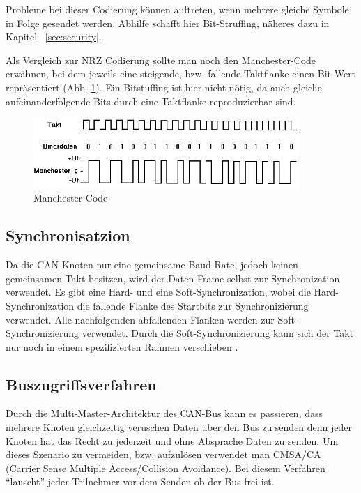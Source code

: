 Probleme bei dieser Codierung können auftreten, wenn mehrere gleiche Symbole in Folge
gesendet werden. Abhilfe schafft hier Bit-Struffing, näheres dazu in Kapitel ~\ref{sec:security}.

Als Vergleich zur NRZ Codierung sollte man noch den Manchester-Code erwähnen, bei dem
jeweils eine steigende, bzw. fallende Taktflanke einen Bit-Wert repräsentiert (Abb. \ref{mancode}).
Ein Bitstuffing ist hier nicht nötig, da auch gleiche aufeinanderfolgende Bits durch eine Taktflanke 
reproduzierbar sind.

\begin{figure}[h] 
\centering
\includegraphics[width=0.9\textwidth]{figures/mancode}
\caption{Manchester-Code \citep{MAN}} 
\label{mancode}
\end{figure} 
	
\subsection{Synchronisatzion}

Da die CAN Knoten nur eine gemeinsame Baud-Rate, jedoch keinen gemeinsamen Takt besitzen, 
wird der Daten-Frame selbst zur Synchronization verwendet. Es gibt eine Hard- und eine Soft-Synchronization,
wobei die Hard-Synchronization die fallende Flanke des Startbits zur Synchronizierung verwendet. Alle 
nachfolgenden abfallenden Flanken werden zur Soft-Synchronizierung verwendet. Durch die Soft-Synchronizierung
kann sich der Takt nur noch in einem spezifizierten Rahmen verschieben \citep[nach][]{BSY}.
	
\subsection{Buszugriffsverfahren}

Durch die Multi-Master-Architektur des CAN-Bus kann es passieren, dass mehrere Knoten gleichzeitig veruschen
Daten über den Bus zu senden denn jeder Knoten hat das Recht zu jederzeit und ohne Absprache Daten zu senden.
Um dieses Szenario zu vermeiden, bzw. aufzulösen verwendet man CMSA/CA (Carrier Sense Multiple 
Access/Collision Avoidance). Bei diesem Verfahren ``lauscht'' jeder Teilnehmer vor dem Senden ob der Bus frei ist.

